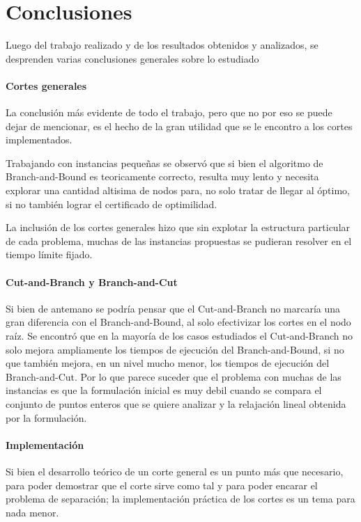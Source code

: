 \section{Conclusiones}


Luego del trabajo realizado y de los resultados obtenidos y analizados, se desprenden varias conclusiones generales sobre lo estudiado

\medskip
\paragraph{Cortes generales}
La conclusi\'on m\'as evidente de todo el trabajo, pero que no por eso se puede dejar de mencionar, es el hecho de la gran utilidad que se le encontro a los cortes implementados.

Trabajando con instancias peque\~nas se observ\'o que si bien el algoritmo de Branch-and-Bound es teoricamente correcto, resulta muy lento y necesita explorar una cantidad altisima de nodos para, no solo tratar de llegar al \'optimo, si no tambi\'en lograr el certificado de optimilidad.

La inclusi\'on de los cortes generales hizo que sin explotar la estructura particular de cada problema, muchas de las instancias propuestas se pudieran resolver en el tiempo l\'imite fijado.

\medskip
\paragraph{Cut-and-Branch y Branch-and-Cut}

Si bien de antemano se podr\'ia pensar que el Cut-and-Branch no marcar\'ia una gran diferencia con el Branch-and-Bound, al solo efectivizar los cortes en el nodo ra\'iz. Se encontr\'o que en la mayor\'ia de los casos estudiados el Cut-and-Branch no solo mejora ampliamente los tiempos de ejecuci\'on del Branch-and-Bound, si no que tambi\'en mejora, en un nivel mucho menor, los tiempos de ejecuci\'on del Branch-and-Cut. Por lo que parece suceder que el problema con muchas de las instancias es que la formulaci\'on inicial es muy debil cuando se compara el conjunto de puntos enteros que se quiere analizar y la relajaci\'on lineal obtenida por la formulaci\'on.


\medskip
\paragraph{Implementaci\'on}

Si bien el desarrollo te\'orico de un corte general es un punto m\'as que necesario, para poder demostrar que el corte sirve como tal y para poder encarar el problema de separaci\'on; la implementaci\'on pr\'actica de los cortes es un tema para nada menor. 


